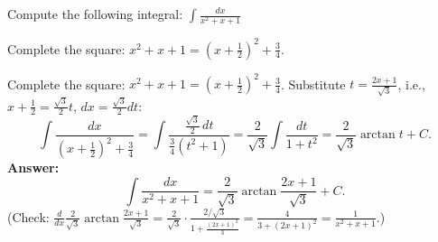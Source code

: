 
\begin{question}
Compute the following integral:
$\displaystyle\int\frac{dx}{x^2+x+1}$
\end{question}

\begin{hint}
Complete the square: $x^2+x+1=\left(x+\frac12\right)^2+\frac34$.
\end{hint}

\begin{solution}
Complete the square: $x^2+x+1=\left(x+\frac12\right)^2+\frac34$. Substitute $t=\frac{2x+1}{\sqrt3}$, i.e., $x+\frac12=\frac{\sqrt3}{2}t$, $dx=\frac{\sqrt3}{2}dt$:
\[
\int\frac{dx}{\left(x+\frac12\right)^2+\frac34}=\int\frac{\frac{\sqrt3}{2}\,dt}{\frac34(t^2+1)}=\frac{2}{\sqrt3}\int\frac{dt}{1+t^2}=\frac{2}{\sqrt3}\arctan t+C.
\]
\textbf{Answer:}
\[
\int\frac{dx}{x^2+x+1}=\frac{2}{\sqrt3}\arctan\frac{2x+1}{\sqrt3}+C.
\]
(Check: $\frac{d}{dx}\frac{2}{\sqrt3}\arctan\frac{2x+1}{\sqrt3}=\frac{2}{\sqrt3}\cdot\frac{2/\sqrt3}{1+\frac{(2x+1)^2}{3}}=\frac{4}{3+(2x+1)^2}=\frac{1}{x^2+x+1}$.)
\end{solution}
